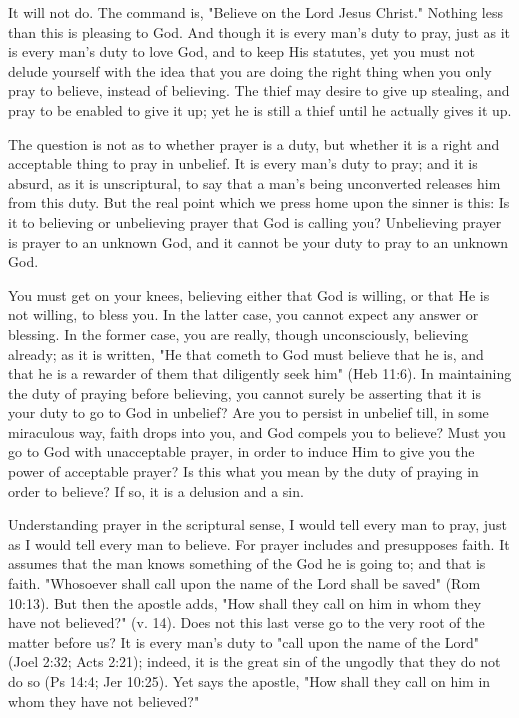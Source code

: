 \documentclass[
]{book}
\begin{document}
It will not do. The command is, "Believe on the Lord Jesus Christ." Nothing less than this is pleasing to God. And though it is every man's duty to pray, just as it is every man's duty to love God, and to keep His statutes, yet you must not delude yourself with the idea that you are doing the right thing when you only pray to believe, instead of believing. The thief may desire to give up stealing, and pray to be enabled to give it up; yet he is still a thief until he actually gives it up.

The question is not as to whether prayer is a duty, but whether it is a right and acceptable thing to pray in unbelief. It is every man's duty to pray; and it is absurd, as it is unscriptural, to say that a man's being unconverted releases him from this duty. But the real point which we press home upon the sinner is this: Is it to believing or unbelieving prayer that God is calling you? Unbelieving prayer is prayer to an unknown God, and it cannot be your duty to pray to an unknown God.

You must get on your knees, believing either that God is willing, or that He is not willing, to bless you. In the latter case, you cannot expect any answer or blessing. In the former case, you are really, though unconsciously, believing already; as it is written, "He that cometh to God must believe that he is, and that he is a rewarder of them that diligently seek him" (Heb 11:6). In maintaining the duty of praying before believing, you cannot surely be asserting that it is your duty to go to God in unbelief? Are you to persist in unbelief till, in some miraculous way, faith drops into you, and God compels you to believe? Must you go to God with unacceptable prayer, in order to induce Him to give you the power of acceptable prayer? Is this what you mean by the duty of praying in order to believe? If so, it is a delusion and a sin.

Understanding prayer in the scriptural sense, I would tell every man to pray, just as I would tell every man to believe. For prayer includes and presupposes faith. It assumes that the man knows something of the God he is going to; and that is faith. "Whosoever shall call upon the name of the Lord shall be saved" (Rom 10:13). But then the apostle adds, "How shall they call on him in whom they have not believed?" (v. 14). Does not this last verse go to the very root of the matter before us? It is every man's duty to "call upon the name of the Lord" (Joel 2:32; Acts 2:21); indeed, it is the great sin of the ungodly that they do not do so (Ps 14:4; Jer 10:25). Yet says the apostle, "How shall they call on him in whom they have not believed?"
\end{document}
